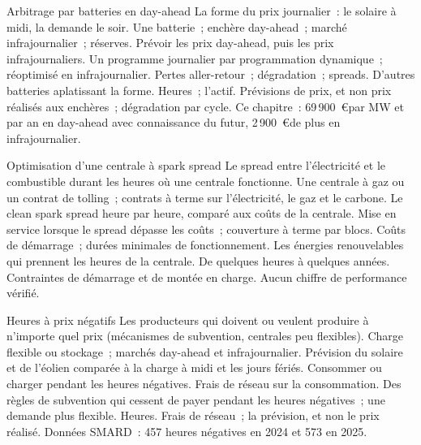 \begin{strategyfile}{Arbitrage par batteries en day-ahead}\label{strat:s2:power-and-gas-trading:battery}
 La forme du prix journalier~: le solaire à midi, la demande le soir.
 Une batterie~; enchère day-ahead~; marché infrajournalier~; réserves.
 Prévoir les prix day-ahead, puis les prix infrajournaliers.
 Un programme journalier par programmation dynamique~; réoptimisé en infrajournalier.
 Pertes aller-retour~; dégradation~; spreads.
 D'autres batteries aplatissant la forme.
 Heures~; l'actif.
 Prévisions de prix, et non prix réalisés aux enchères~; dégradation par cycle.
 Ce chapitre~: 69\,900~\euro par MW et par an en day-ahead avec connaissance du futur, 2\,900~\euro de plus en infrajournalier.
\end{strategyfile}

\begin{strategyfile}{Optimisation d'une centrale à spark spread}\label{strat:s2:power-and-gas-trading:plant}
 Le spread entre l'électricité et le combustible durant les heures où une centrale fonctionne.
 Une centrale à gaz ou un contrat de tolling~; contrats à terme sur l'électricité, le gaz et le carbone.
 Le clean spark spread heure par heure, comparé aux coûts de la centrale.
 Mise en service lorsque le spread dépasse les coûts~; couverture à terme par blocs.
 Coûts de démarrage~; durées minimales de fonctionnement.
 Les énergies renouvelables qui prennent les heures de la centrale.
 De quelques heures à quelques années.
 Contraintes de démarrage et de montée en charge.
 Aucun chiffre de performance vérifié.
\end{strategyfile}

\begin{strategyfile}{Heures à prix négatifs}\label{strat:s2:power-and-gas-trading:negative}
 Les producteurs qui doivent ou veulent produire à n'importe quel prix (mécanismes de subvention, centrales peu flexibles).
 Charge flexible ou stockage~; marchés day-ahead et infrajournalier.
 Prévision du solaire et de l'éolien comparée à la charge à midi et les jours fériés.
 Consommer ou charger pendant les heures négatives.
 Frais de réseau sur la consommation.
 Des règles de subvention qui cessent de payer pendant les heures négatives~; une demande plus flexible.
 Heures.
 Frais de réseau~; la prévision, et non le prix réalisé.
 Données SMARD~: 457 heures négatives en 2024 et 573 en 2025.
\end{strategyfile}

